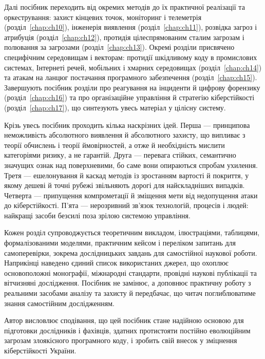 Далі посібник переходить від окремих методів до їх практичної реалізації та оркестрування: захист кінцевих точок, моніторинг і телеметрія (розділ~\ref{chap:ch10}), інженерія виявлення (розділ~\ref{chap:ch11}), розвідка загроз і атрибуція (розділ~\ref{chap:ch12}), протидія цілеспрямованим сталим загрозам і полювання за загрозами (розділ~\ref{chap:ch13}). Окремі розділи присвячено специфічним середовищам і векторам: протидії шкідливому коду в промислових системах, Інтернеті речей, мобільних і хмарних середовищах (розділ~\ref{chap:ch14}) та атакам на ланцюг постачання програмного забезпечення (розділ~\ref{chap:ch15}). Завершують посібник розділи про реагування на інциденти й цифрову форензику (розділ~\ref{chap:ch16}) та про організаційне управління й стратегію кіберстійкості (розділ~\ref{chap:ch17}), що синтезують увесь матеріал у цілісну систему.

Крізь увесь посібник проходить кілька наскрізних ідей. Перша --- принципова неможливість абсолютного виявлення й абсолютного захисту, що випливає з теорії обчислень і теорії ймовірностей, а отже й необхідність мислити категоріями ризику, а не гарантій. Друга --- перевага стійких, семантично значущих ознак над поверхневими, бо саме вони опираються спробам ухилення. Третя --- ешелонування й каскад методів із зростанням вартості й покриття, у якому дешеві й точні рубежі звільняють дорогі для найскладніших випадків. Четверта --- припущення компрометації й зміщення мети від недопущення атаки до кіберстійкості. П'ята --- нерозривний зв'язок технологій, процесів і людей: найкращі засоби безсилі поза зрілою системою управління.

Кожен розділ супроводжується теоретичним викладом, ілюстраціями, таблицями, формалізованими моделями, практичним кейсом і переліком запитань для самоперевірки, зокрема дослідницьких завдань для самостійної наукової роботи. Наприкінці наведено єдиний список використаних джерел, що охоплює основоположні монографії, міжнародні стандарти, провідні наукові публікації та вітчизняні дослідження. Посібник не замінює, а доповнює практичну роботу з реальними засобами аналізу та захисту й передбачає, що читач поглиблюватиме знання самостійним дослідженням.

Автор висловлює сподівання, що цей посібник стане надійною основою для підготовки дослідників і фахівців, здатних протистояти постійно еволюційним загрозам злоякісного програмного коду, і зробить свій внесок у зміцнення кіберстійкості України.
